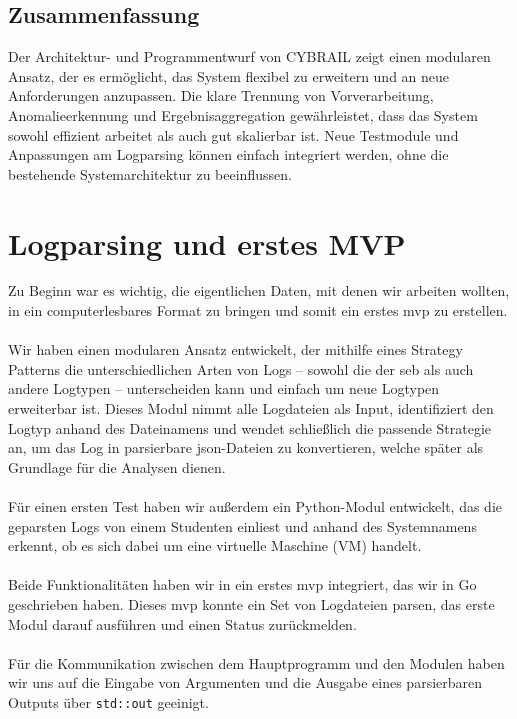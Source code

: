 \subsection{Zusammenfassung}

Der Architektur- und Programmentwurf von CYBRAIL zeigt einen modularen Ansatz, der es ermöglicht, das System flexibel zu erweitern und an neue Anforderungen anzupassen. Die klare Trennung von Vorverarbeitung, Anomalieerkennung und Ergebnisaggregation gewährleistet, dass das System sowohl effizient arbeitet als auch gut skalierbar ist. Neue Testmodule und Anpassungen am Logparsing können einfach integriert werden, ohne die bestehende Systemarchitektur zu beeinflussen.

\section{Logparsing und erstes MVP}
Zu Beginn war es wichtig, die eigentlichen Daten, mit denen wir arbeiten wollten, in ein computerlesbares Format zu bringen und somit ein erstes \gls{mvp} zu erstellen.\\
\\
Wir haben einen modularen Ansatz entwickelt, der mithilfe eines Strategy Patterns die unterschiedlichen Arten von Logs – sowohl die der \gls{seb} als auch andere Logtypen – unterscheiden kann und einfach um neue Logtypen erweiterbar ist. 
Dieses Modul nimmt alle Logdateien als Input, identifiziert den Logtyp anhand des Dateinamens und wendet schließlich die passende Strategie an, um das Log in parsierbare \gls{json}-Dateien zu konvertieren, welche später als Grundlage für die Analysen dienen.\\
\\
Für einen ersten Test haben wir außerdem ein Python-Modul entwickelt, das die geparsten Logs von einem Studenten einliest und anhand des Systemnamens erkennt, ob es sich dabei um eine virtuelle Maschine (VM) handelt.\\
\\
Beide Funktionalitäten haben wir in ein erstes \gls{mvp} integriert, das wir in Go geschrieben haben. Dieses \gls{mvp} konnte ein Set von Logdateien parsen, das erste Modul darauf ausführen und einen Status zurückmelden.\\
\\
Für die Kommunikation zwischen dem Hauptprogramm und den Modulen haben wir uns auf die Eingabe von Argumenten und die Ausgabe eines parsierbaren Outputs über \texttt{std::out} geeinigt.

